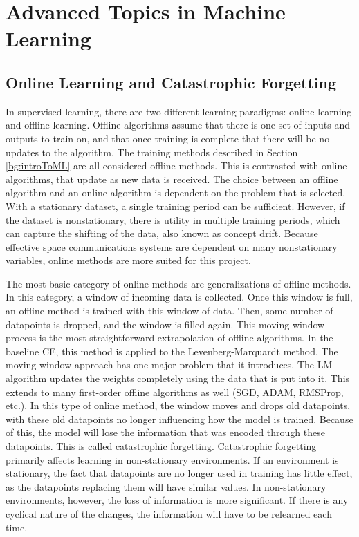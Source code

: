 \documentclass[11pt]{report}
\begin{document}
	\section{Advanced Topics in Machine Learning}
	\subsection{Online Learning and Catastrophic Forgetting}
	\par In supervised learning, there are two different learning paradigms: online learning and offline learning. Offline algorithms assume that there is one set of inputs and outputs to train on, and that once training is complete that there will be no updates to the algorithm. The training methods described in Section \ref{bg:introToML} are all considered offline methods. This is contrasted with online algorithms, that update as new data is received. The choice between an offline algorithm and an online algorithm is dependent on the problem that is selected. With a stationary dataset, a single training period can be sufficient. However, if the dataset is nonstationary, there is utility in multiple training periods, which can capture the shifting of the data, also known as concept drift. Because effective space communications systems are dependent on many nonstationary variables, online methods are more suited for this project.
	\par The most basic category of online methods are generalizations of offline methods. In this category, a window of incoming data is collected. Once this window is full, an offline method is trained with this window of data. Then, some number of datapoints is dropped, and the window is filled again. This moving window process is the most straightforward extrapolation of offline algorithms. In the baseline CE, this method is applied to the Levenberg-Marquardt method. The moving-window approach has one major problem that it introduces. The LM algorithm updates the weights completely using the data that is put into it. This extends to many first-order offline algorithms as well (SGD, ADAM, RMSProp, etc.). In this type of online method, the window moves and drops old datapoints, with these old datapoints no longer influencing how the model is trained. Because of this, the model will lose the information that was encoded through these datapoints. This is called catastrophic forgetting.  Catastrophic forgetting primarily affects learning in non-stationary environments. If an environment is stationary, the fact that datapoints are no longer used in training has little effect, as the datapoints replacing them will have similar values. In non-stationary environments, however, the loss of information is more significant. If there is any cyclical nature of the changes, the information will have to be relearned each time.
\end{document}
